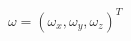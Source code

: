 \documentclass[preview]{standalone}
\begin{document}
\begin{center}
$\omega = (\omega_x, \omega_y, \omega_ z)^T$
\end{center}
\end{document}
